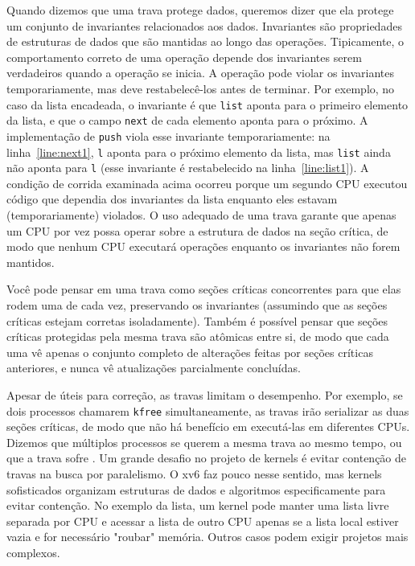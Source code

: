 Quando dizemos que uma trava protege dados, queremos dizer
que ela protege um conjunto de invariantes
relacionados aos dados.
Invariantes são propriedades de estruturas de dados que
são mantidas ao longo das operações.
Tipicamente, o comportamento correto de uma operação depende
dos invariantes serem verdadeiros quando a operação
se inicia. A operação pode violar os invariantes temporariamente,
mas deve restabelecê-los antes de terminar.
Por exemplo, no caso da lista encadeada, o invariante é que
\lstinline{list}
aponta para o primeiro elemento da lista,
e que o campo
\lstinline{next}
de cada elemento aponta para o próximo.
A implementação de
\lstinline{push}
viola esse invariante temporariamente: na linha~\ref{line:next1},
\lstinline{l}
aponta
para o próximo elemento da lista, mas
\lstinline{list}
ainda não aponta para
\lstinline{l}
(esse invariante é restabelecido na linha~\ref{line:list1}).
A condição de corrida examinada acima
ocorreu porque um segundo CPU executou
código que dependia dos invariantes da lista
enquanto eles estavam (temporariamente) violados.
O uso adequado de uma trava garante que apenas um CPU por vez
possa operar sobre a estrutura de dados na seção crítica, de modo que
nenhum CPU executará operações enquanto os invariantes não forem mantidos.

Você pode pensar em uma trava como
seções críticas concorrentes para que elas rodem uma de cada vez,
preservando os invariantes (assumindo que as seções críticas
estejam corretas isoladamente).
Também é possível pensar que seções críticas protegidas pela mesma trava são
atômicas entre si,
de modo que cada uma vê apenas o conjunto completo de
alterações feitas por seções críticas anteriores, e nunca vê
atualizações parcialmente concluídas.

Apesar de úteis para correção, as travas limitam
o desempenho. Por exemplo, se dois processos chamarem {\tt kfree}
simultaneamente, as travas irão serializar as duas seções críticas,
de modo que não há
benefício em executá-las em diferentes CPUs. Dizemos que múltiplos
processos  se querem a mesma trava ao mesmo
tempo, ou que a trava sofre . Um grande
desafio no projeto de kernels é evitar contenção de travas
na busca por paralelismo. O xv6
faz pouco nesse sentido, mas kernels sofisticados organizam
estruturas de dados e algoritmos especificamente para evitar contenção. No exemplo da lista,
um kernel pode manter uma lista livre separada por CPU e acessar
a lista de outro CPU apenas se a lista local estiver vazia e for necessário "roubar"
memória. Outros casos podem exigir
projetos mais complexos.

